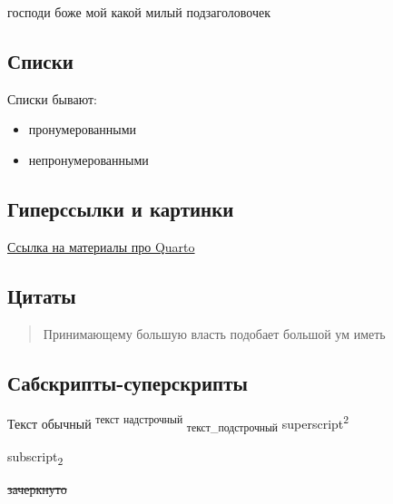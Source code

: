 \documentclass[
  letterpaper,
  DIV=11,
  numbers=noendperiod]{scrartcl}
\providecommand{\tightlist}{%
  \setlength{\itemsep}{0pt}\setlength{\parskip}{0pt}}\usepackage{longtable,booktabs,array}
\begin{document}
господи боже мой какой милый подзаголовочек

\hypertarget{ux441ux43fux438ux441ux43aux438}{%
\subsection{Списки}\label{ux441ux43fux438ux441ux43aux438}}

Списки бывают:

\begin{itemize}
\tightlist
\item
  пронумерованными
\item
  непронумерованными
\end{itemize}

\hypertarget{ux433ux438ux43fux435ux440ux441ux441ux44bux43bux43aux438-ux438-ux43aux430ux440ux442ux438ux43dux43aux438}{%
\subsection{Гиперссылки и
картинки}\label{ux433ux438ux43fux435ux440ux441ux441ux44bux43bux43aux438-ux438-ux43aux430ux440ux442ux438ux43dux43aux438}}

\href{https://pozdniakov.github.io/tidy_stats/250-rmarkdown.html\#sec-quarto}{Ссылка
на материалы про Quarto}

\hypertarget{ux446ux438ux442ux430ux442ux44b}{%
\subsection{Цитаты}\label{ux446ux438ux442ux430ux442ux44b}}

\begin{quote}
Принимающему большую власть подобает большой ум иметь
\end{quote}

\hypertarget{ux441ux430ux431ux441ux43aux440ux438ux43fux442ux44b-ux441ux443ux43fux435ux440ux441ux43aux440ux438ux43fux442ux44b}{%
\subsection{Сабскрипты-суперскрипты}\label{ux441ux430ux431ux441ux43aux440ux438ux43fux442ux44b-ux441ux443ux43fux435ux440ux441ux43aux440ux438ux43fux442ux44b}}

Текст обычный \textsuperscript{текст} \textsuperscript{надстрочный}
\textsubscript{текст\_подстрочный} superscript\textsuperscript{2}

subscript\textsubscript{2}

\sout{зачеркнуто}
\end{document}
